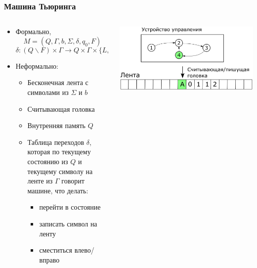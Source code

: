 \documentclass[xetex,mathserif,serif]{beamer}
\begin{document}
    \begin{frame}
        \frametitle{Машина Тьюринга}
        \begin{columns}
            \begin{column}{0.6\textwidth}
                \begin{itemize}
                    \item Формально,
                        $$M = (Q, \Gamma, b, \Sigma, \delta, q_0, F)$$
                        $$\delta : (Q \backslash F) × \Gamma \rightarrow Q × \Gamma × \{L, R\}$$
                    \item Неформально:
                    \begin{itemize}
                        \item Бесконечная лента с символами из $\Sigma$ и $b$
                        \item Считывающая головка
                        \item Внутренняя память $Q$
                        \item Таблица переходов $\delta$, которая по текущему состоянию из $Q$ и текущему символу на ленте из $\Gamma$ говорит машине, что делать:
                        \begin{itemize}
                            \item перейти в состояние
                            \item записать символ на ленту
                            \item сместиться влево/вправо
                        \end{itemize}
                    \end{itemize}
                \end{itemize}
            \end{column}
            \begin{column}{0.4\textwidth}
                \begin{center}
                    \includegraphics[width=\textwidth]{turingMachine.png}
                \end{center}
            \end{column}
        \end{columns}
    \end{frame}
\end{document}
